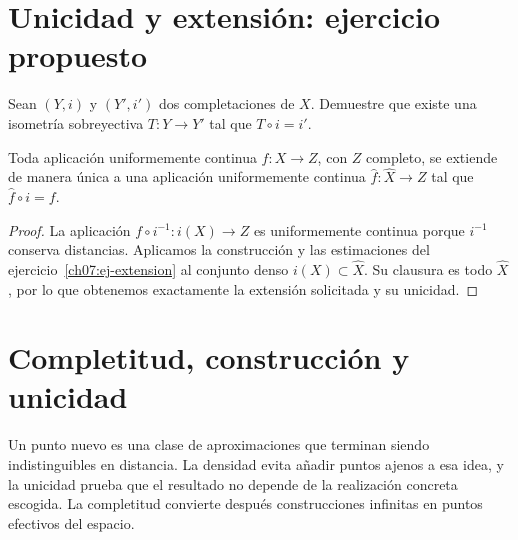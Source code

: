 \section{Unicidad y extensión: ejercicio propuesto}
\begin{ejercicio}\label{ej:lectura-9-1}\label{ch09:unicidad}
Sean $(Y,i)$ y $(Y',i')$ dos completaciones de $X$. Demuestre que existe una isometría sobreyectiva $T:Y\to Y'$ tal que $T\circ i=i'$.
\end{ejercicio}


\begin{corolario}\label{ch09:extension}
Toda aplicación uniformemente continua $f:X\to Z$, con $Z$ completo, se extiende de manera única a una aplicación uniformemente continua $\widehat f:\widehat X\to Z$ tal que $\widehat f\circ i=f$.
\end{corolario}
\begin{proof}
La aplicación $f\circ i^{-1}:i(X)\to Z$ es uniformemente continua porque $i^{-1}$ conserva distancias. Aplicamos la construcción y las estimaciones del ejercicio~\ref{ch07:ej-extension} al conjunto denso $i(X)\subset\widehat X$. Su clausura es todo $\widehat X$, por lo que obtenemos exactamente la extensión solicitada y su unicidad.
\end{proof}

\section{Completitud, construcción y unicidad}
Un punto nuevo es una clase de aproximaciones que terminan siendo indistinguibles en distancia. La densidad evita añadir puntos ajenos a esa idea, y la unicidad prueba que el resultado no depende de la realización concreta escogida. La completitud convierte después construcciones infinitas en puntos efectivos del espacio.
